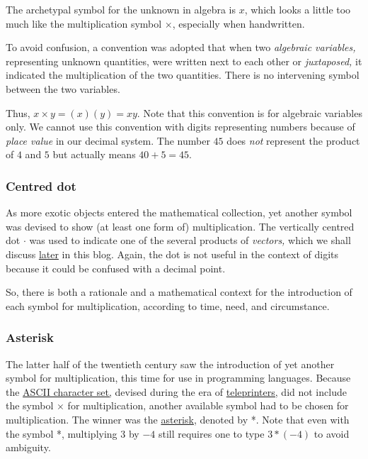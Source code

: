 \documentclass[
  a4paper,
]{article}
\begin{document}
The archetypal symbol for the unknown in algebra is \(x\), which looks a
little too much like the multiplication symbol \(\times\), especially
when handwritten.

To avoid confusion, a convention was adopted that when two
\emph{algebraic variables,} representing unknown quantities, were
written next to each other or \emph{juxtaposed,} it indicated the
multiplication of the two quantities. There is no intervening symbol
between the two variables.

Thus, \(x \times y = (x)(y) = xy\). Note that this convention is for
algebraic variables only. We cannot use this convention with digits
representing numbers because of \emph{place value} in our decimal
system. The number \(45\) does \emph{not} represent the product of \(4\)
and \(5\) but actually means \(40 + 5 = 45\).

\hypertarget{centred-dot}{%
\subsubsection{Centred dot}\label{centred-dot}}

As more exotic objects entered the mathematical collection, yet another
symbol was devised to show (at least one form of) multiplication. The
vertically centred dot \(\cdot\) was used to indicate one of the several
products of \emph{vectors,} which we shall discuss
\protect\hyperlink{dot-or-scalar-product}{later} in this blog. Again,
the dot is not useful in the context of digits because it could be
confused with a decimal point.

So, there is both a rationale and a mathematical context for the
introduction of each symbol for multiplication, according to time, need,
and circumstance.

\hypertarget{asterisk}{%
\subsubsection{Asterisk}\label{asterisk}}

The latter half of the twentieth century saw the introduction of yet
another symbol for multiplication, this time for use in programming
languages. Because the
\href{https://datatracker.ietf.org/doc/html/rfc20}{ASCII character set,}
devised during the era of
\href{https://en.wikipedia.org/wiki/Teleprinter}{teleprinters,} did not
include the symbol \(\times\) for multiplication, another available
symbol had to be chosen for multiplication. The winner was the
\href{https://en.wikipedia.org/wiki/Asterisk}{asterisk}, denoted by *.
Note that even with the symbol *, multiplying \(3\) by \(-4\) still
requires one to type \(3 * (-4)\) to avoid ambiguity.
\end{document}
